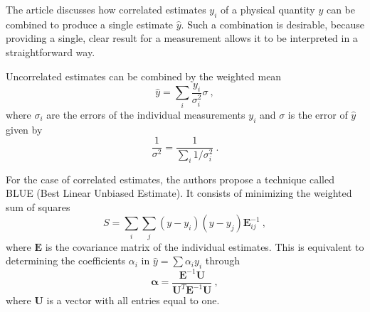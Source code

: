 

\usetikzlibrary{calc}
\usetikzlibrary{arrows,shapes}

\newcommand{\package}[1]{\texttt{#1}}
\newcommand{\class}[1]{\texttt{#1}}
\newcommand{\function}[1]{\texttt{#1}}
\newcommand{\fpath}[1]{\texttt{#1}}

\captionsetup{width=0.45\textwidth}

\newcommand{\eg}{e.g.\@ }

\usepackage{hyphenat}




The article discusses how correlated estimates $y_i$ of a physical quantity $y$ can be combined to produce a single estimate $\hat{y}$.
Such a combination is desirable, because providing a single, clear result for a measurement allows it to be interpreted in a straightforward way.

Uncorrelated estimates can be combined by the weighted mean
\begin{equation}
  \hat{y} = \sum_i{\frac{y_i}{\sigma_i^2}} σ\:,
\end{equation}
where $σ_i$ are the errors of the individual measurements $y_i$ and $σ$ is the error of $\hat{y}$ given by
\begin{equation}
  \frac{1}{σ^2} = \frac{1}{\sum_i 1/σ_i^2 }\:.
\end{equation}

For the case of correlated estimates, the authors propose a technique called BLUE (Best Linear Unbiased Estimate).
It consists of minimizing the weighted sum of squares
\begin{equation}
  S = \sum_i \sum_j (y - y_i) (y - y_j) \mathbf{E}^{-1}_{ij}\:,
  \label{squares}
\end{equation}
where $\mathbf{E}$ is the covariance matrix of the individual estimates.
This is equivalent to determining the coefficients $α_i$ in $\hat{y} = \sum \alpha_i y_i$ through
\begin{equation}
  \mathbf{\alpha} = \frac{\mathbf{E}^{-1} \mathbf{U}}{\mathbf{U}^T \mathbf{E}^{-1} \mathbf{U}}\:,
\end{equation}
where $\mathbf{U}$ is a vector with all entries equal to one.

